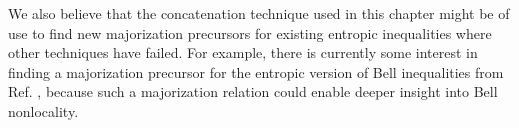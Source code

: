 We also believe that the concatenation technique used in this chapter might be of use to find new majorization precursors for existing entropic inequalities where other techniques have failed. For example, there is currently some interest in finding a majorization precursor for the entropic version of Bell inequalities from Ref. \cite{cerf_entropic_1997}, because such a majorization relation could enable deeper insight into Bell nonlocality.